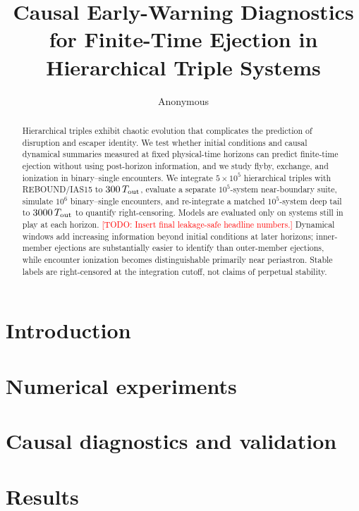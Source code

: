 \documentclass[twocolumn]{aastex631}
\newcommand{\Tout}{T_{\rm out}}
\newcommand{\todo}[1]{\textcolor{red}{[TODO: #1]}}
\begin{document}
\title{Causal Early-Warning Diagnostics for Finite-Time Ejection in Hierarchical Triple Systems}

\author{Anonymous}

\begin{abstract}
Hierarchical triples exhibit chaotic evolution that complicates the prediction of
disruption and escaper identity. We test whether initial conditions and causal
dynamical summaries measured at fixed physical-time horizons can predict
finite-time ejection without using post-horizon information, and we study flyby,
exchange, and ionization in binary--single encounters. We integrate
$5\times10^5$ hierarchical triples with REBOUND/IAS15 to $300\,\Tout$, evaluate
a separate $10^5$-system near-boundary suite, simulate $10^6$ binary--single
encounters, and re-integrate a matched $10^5$-system deep tail to
$3000\,\Tout$ to quantify right-censoring. Models are evaluated only on systems
still in play at each horizon. \todo{Insert final leakage-safe headline numbers.}
Dynamical windows add increasing information beyond initial conditions at later
horizons; inner-member ejections are substantially easier to identify than
outer-member ejections, while encounter ionization becomes distinguishable
primarily near periastron. Stable labels are right-censored at the integration
cutoff, not claims of perpetual stability.
\end{abstract}


\section{Introduction}
\label{sec:introduction}


\section{Numerical experiments}
\label{sec:simulations}


\section{Causal diagnostics and validation}
\label{sec:methods}


\section{Results}
\label{sec:results}

\end{document}
